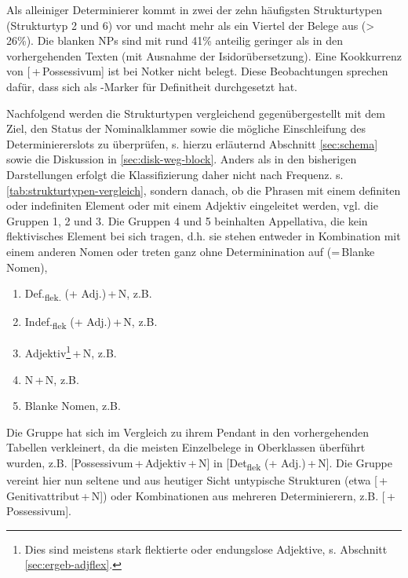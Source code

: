 Als alleiniger Determinierer kommt  in zwei der zehn häufigsten Strukturtypen (Strukturtyp 2 und 6) vor und macht mehr als ein Viertel der Belege aus (> 26\%). Die blanken NPs sind mit rund 41\% anteilig geringer als in den vorhergehenden Texten (mit Ausnahme der Isidorübersetzung). Eine Kookkurrenz von [\,+\,Possessivum] ist bei Notker nicht belegt. Diese Beobachtungen sprechen dafür, dass  sich als -Marker für  Definitheit durchgesetzt hat. 


Nachfolgend werden die Strukturtypen vergleichend gegenübergestellt mit dem Ziel, den Status der Nominalklammer sowie die mögliche Einschleifung des Determiniererslots zu überprüfen, s. hierzu erläuternd Abschnitt \ref{sec:schema} sowie die Diskussion in \ref{sec:disk-weg-block}. Anders als in den bisherigen Darstellungen erfolgt die Klassifizierung  daher nicht nach Frequenz. s. \ref{tab:strukturtypen-vergleich}, sondern danach, ob die Phrasen mit einem definiten oder indefiniten Element oder mit einem Adjektiv eingeleitet werden, vgl. die Gruppen 1, 2 und 3. Die Gruppen 4 und 5 beinhalten  Appellativa, die kein flektivisches Element bei sich tragen, d.h. sie stehen entweder in Kombination mit einem anderen Nomen oder treten ganz ohne Determinination auf (=\,Blanke Nomen), 

\begin{enumerate}
\item Def.\textsubscript{flek.} (+ Adj.)\,+\,N, z.B.  
\item Indef.\textsubscript{flek} (+ Adj.)\,+\,N, z.B. 
\item Adjektiv\footnote{Dies sind meistens stark flektierte oder endungslose Adjektive, s. Abschnitt \ref{sec:ergeb-adjflex}.}\,+\,N, z.B.  
\item N\,+\,N, z.B. 
\item Blanke Nomen, z.B. 
\end{enumerate}

Die Gruppe  hat sich im Vergleich zu ihrem Pendant in den vorhergehenden Tabellen verkleinert, da die meisten Einzelbelege in Oberklassen überführt wurden,  z.B. [Possessivum\,+\,Adjektiv\,+\,N] in [Det\textsubscript{flek} (+ Adj.)\,+\,N]. Die Gruppe vereint hier nun seltene und aus heutiger Sicht untypische Strukturen (etwa [\,+ Genitivattribut\,+\,N]) oder Kombinationen aus mehreren Determinierern, z.B. [\,+\,Possessivum]. 

